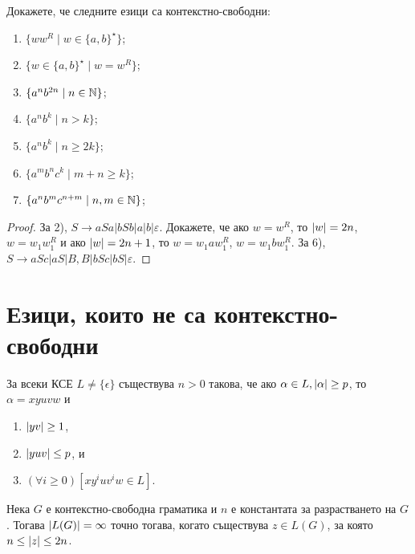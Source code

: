 \begin{problem}
  Докажете, че следните езици са контекстно-свободни:
  \begin{enumerate}[1)]
  \item
    $\{ww^R \mid w \in \{a,b\}^\star\}$;
  \item
    $\{w \in \{a,b\}^\star \mid w = w^R\}$;
  \item
    $\{a^nb^{2n} \mid n \in \mathbb{N}\}$;
  \item
    $\{a^nb^k \mid n > k\}$;
  \item
    $\{a^nb^k \mid n \geq 2k\}$;
  \item
    $\{a^mb^nc^k\mid m+n \geq k\}$;
  \item
    $\{a^nb^mc^{n+m}\mid n,m \in \mathbb{N}\}$;
  \end{enumerate}
\end{problem}
\begin{proof}
  За 2), $S \rightarrow aSa \vert bSb \vert a\vert b \vert \varepsilon$.
  Докажете, че ако $w = w^R$, то $\vert{w}\vert = 2n$, $w = w_1w^R_1$ и ако $\vert{w}\vert = 2n+1$, то $w = w_1aw^R_1$, $w = w_1bw^R_1$.
  За 6), $S \rightarrow aSc\vert aS \vert B, B\vert bSc\vert bS\vert\varepsilon$.
\end{proof}


\section{Езици, които не са контекстно-свободни}

\begin{lemma}
  \label{lem:pumping-context} 
  За всеки КСЕ $L\neq\{\epsilon\}$ съществува $n>0$ такова,
  че ако $\alpha\in L, \vert{\alpha}\vert \geq p$, то $\alpha=xyuvw$ и
  \begin{enumerate}
  \item
    $\vert{yv}\vert\geq 1$,
  \item
    $\vert{yuv}\vert\leq p$, и
  \item
    $(\forall i\geq 0)[xy^iuv^iw\in L]$.
\end{enumerate}
\end{lemma}

\begin{crl}
  Нека $G$ е контекстно-свободна граматика и $n$ е константата за разрастването на $G$.
  Тогава $\vert{L(G)}\vert = \infty$ точно тогава, когато съществува $z \in L(G)$, за която $n \leq \vert{z}\vert \leq 2n$.
\end{crl}

